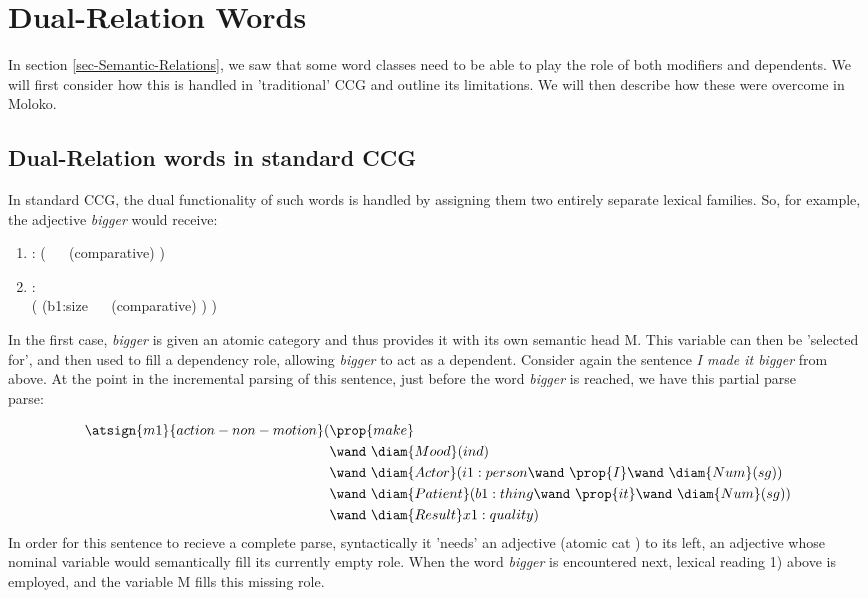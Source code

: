 \section{Dual-Relation Words} \label{sec-Dual-Relation-Words}
 
In section \ref{sec-Semantic-Relations}, we saw that some word classes need to be able to play the role of both modifiers and dependents. We will first consider how this is handled in 'traditional' \textsc{CCG} and outline its limitations.  We will then describe how these were overcome in Moloko.
 
 \subsection{Dual-Relation words in standard \textsc{CCG} }

In standard \textsc{CCG}, the dual functionality of such words is handled by assigning them two entirely separate lexical families. So, for example, the adjective \emph{bigger} would receive:

\begin{enumerate}
\item {}    :    ( \wand\   \wand\ (comparative) )
\item {}  : \\ (  (b1:size \wand\   \wand\ (comparative) ) )
\end{enumerate}
In the first case, \emph{bigger} is given an atomic category  and thus provides it with its own semantic head M. This variable can then be 'selected for', and then used to fill a dependency role, allowing \emph{bigger} to act as a dependent. Consider again the sentence \emph{I made it bigger} from above. At the point in the incremental parsing of this sentence, just before the word \emph{bigger} is reached, we have this partial parse \\

parse:  
\vspace{-1.5em} %

\begin{align*}
\atsign{m1}{action-non-motion}(& \prop{make}  \\ 
      & \wand\ \diam{Mood}(ind) \\
      & \wand\ \diam{Actor}(i1:person \wand\ \prop{I} \wand\ \diam{Num}(sg))  \\ 
      & \wand\ \diam{Patient}(b1:thing \wand\ \prop{it} \wand\ \diam{Num}(sg))  \\
      & \wand\ \diam{Result}x1:quality )
\end{align*}
In order for this sentence to recieve a complete parse, syntactically it 'needs' an adjective (atomic cat  ) to its left, an adjective whose nominal variable would semantically fill its currently empty   role. When the word \emph{bigger} is encountered next, lexical reading 1) above is employed, and the variable M fills this missing role.

